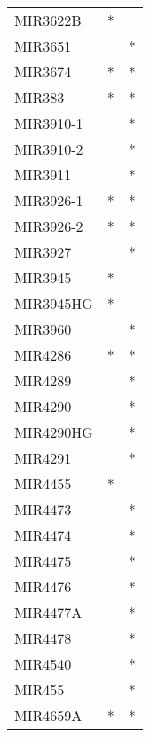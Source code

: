 \begin{longtable}{lcc}
MIR3622B              &              * &            \\
MIR3651               &                &          * \\
MIR3674               &              * &          * \\
MIR383                &              * &          * \\
MIR3910-1             &                &          * \\
MIR3910-2             &                &          * \\
MIR3911               &                &          * \\
MIR3926-1             &              * &          * \\
MIR3926-2             &              * &          * \\
MIR3927               &                &          * \\
MIR3945               &              * &            \\
MIR3945HG             &              * &            \\
MIR3960               &                &          * \\
MIR4286               &              * &          * \\
MIR4289               &                &          * \\
MIR4290               &                &          * \\
MIR4290HG             &                &          * \\
MIR4291               &                &          * \\
MIR4455               &              * &            \\
MIR4473               &                &          * \\
MIR4474               &                &          * \\
MIR4475               &                &          * \\
MIR4476               &                &          * \\
MIR4477A              &                &          * \\
MIR4478               &                &          * \\
MIR4540               &                &          * \\
MIR455                &                &          * \\
MIR4659A              &              * &          * \\

\end{longtable}
